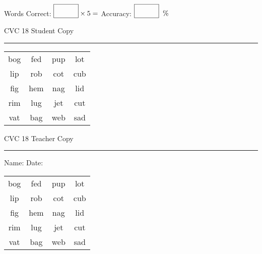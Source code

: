 \documentclass{memoir}
\begin{document}
\normalsize

Words Correct: $\fbox{\phantom{\huge 100}} \times 5 = $ Accuracy: $\fbox{\phantom{\huge 100}}\;\; \%$ 

\vfill

\newpage


\footnotesize \noindent
CVC 18 \hfill Student Copy
\smallskip
\hrule

\huge

\setlength{\tabcolsep}{14pt}
\def\arraystretch{2}

{\selectfont


\begin{vplace}[0.5]
\begin{center}
\begin{tabular}{cccc}
bog & fed & pup & lot \\
lip & rob & cot & cub \\
fig & hem & nag & lid \\
rim & lug & jet & cut \\
vat & bag & web & sad \\
\end{tabular}
\end{center}
\end{vplace}

}

\newpage

\footnotesize \noindent
CVC 18 \hfill Teacher Copy
\smallskip
\hrule

\normalsize

\vfill

\noindent
Name: \underline{\hspace{1.75in}} \hfill Date: \underline{\hspace{1in}}

\huge

{\selectfont


\begin{vplace}[0.5]
\begin{center}
\begin{tabular}{cccc}
bog & fed & pup & lot \\
lip & rob & cot & cub \\
fig & hem & nag & lid \\
rim & lug & jet & cut \\
vat & bag & web & sad \\
\end{tabular}
\end{center}
\end{vplace}



}
\end{document}
